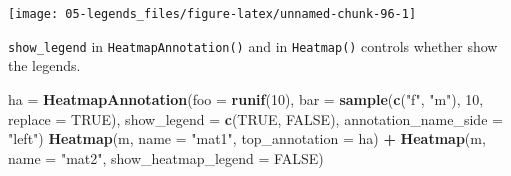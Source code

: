 \documentclass[]{book}
\newenvironment{Shaded}{\begin{snugshade}}{\end{snugshade}}
\newcommand{\KeywordTok}[1]{\textcolor[rgb]{0.13,0.29,0.53}{\textbf{#1}}}
\newcommand{\DataTypeTok}[1]{\textcolor[rgb]{0.13,0.29,0.53}{#1}}
\newcommand{\DecValTok}[1]{\textcolor[rgb]{0.00,0.00,0.81}{#1}}
\newcommand{\StringTok}[1]{\textcolor[rgb]{0.31,0.60,0.02}{#1}}
\newcommand{\OtherTok}[1]{\textcolor[rgb]{0.56,0.35,0.01}{#1}}
\newcommand{\OperatorTok}[1]{\textcolor[rgb]{0.81,0.36,0.00}{\textbf{#1}}}
\newcommand{\NormalTok}[1]{#1}
\theoremstyle{definition}
\theoremstyle{definition}
\theoremstyle{definition}
\theoremstyle{remark}
\begin{document}
\begin{Shaded}
\end{Shaded}

\begin{center}\texttt{[image: 05-legends\_files/figure-latex/unnamed-chunk-96-1]} \end{center}

\texttt{show\_legend} in \texttt{HeatmapAnnotation()} and in
\texttt{Heatmap()} controls whether show the legends.

\begin{Shaded}
\begin{Highlighting}[]
\NormalTok{ha =}\StringTok{ }\KeywordTok{HeatmapAnnotation}\NormalTok{(}\DataTypeTok{foo =} \KeywordTok{runif}\NormalTok{(}\DecValTok{10}\NormalTok{), }
    \DataTypeTok{bar =} \KeywordTok{sample}\NormalTok{(}\KeywordTok{c}\NormalTok{(}\StringTok{"f"}\NormalTok{, }\StringTok{"m"}\NormalTok{), }\DecValTok{10}\NormalTok{, }\DataTypeTok{replace =} \OtherTok{TRUE}\NormalTok{),}
    \DataTypeTok{show_legend =} \KeywordTok{c}\NormalTok{(}\OtherTok{TRUE}\NormalTok{, }\OtherTok{FALSE}\NormalTok{),}
    \DataTypeTok{annotation_name_side =} \StringTok{"left"}\NormalTok{)}
\KeywordTok{Heatmap}\NormalTok{(m, }\DataTypeTok{name =} \StringTok{"mat1"}\NormalTok{, }\DataTypeTok{top_annotation =}\NormalTok{ ha) }\OperatorTok{+}
\KeywordTok{Heatmap}\NormalTok{(m, }\DataTypeTok{name =} \StringTok{"mat2"}\NormalTok{, }\DataTypeTok{show_heatmap_legend =} \OtherTok{FALSE}\NormalTok{)}
\end{Highlighting}
\end{Shaded}
\end{document}
